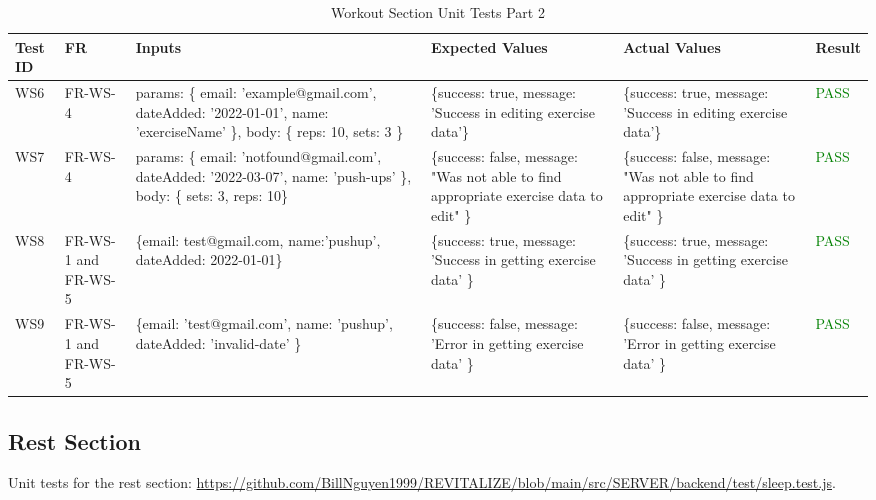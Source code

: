 \documentclass[12pt, titlepage]{article}
\begin{document}
\begin{table}[h]
    \centering
    \small
    \begin{tabularx}{\textwidth}{|X|X|p{3cm}|p{2.5cm}|p{2.5cm}|X|}
        \hline
        Test ID & FR & Inputs & Expected Values & Actual Values & Result \\
        \hline
        WS6 & FR-WS-4 & params: \{ email: 'example@gmail.com', dateAdded: '2022-01-01', name: 'exerciseName' \},
        body: \{ reps: 10, sets: 3 \}  & \{success: true, message: 'Success in editing exercise data'\} & \{success: true, message: 'Success in editing exercise data'\} & \textcolor{Green}{PASS} \\
        \hline
        WS7 & FR-WS-4 & params: \{ email: 'notfound@gmail.com', dateAdded: '2022-03-07', name: 'push-ups' \},
          body: \{ sets: 3, reps: 10\}  & \{success: false, message: "Was not able to find appropriate exercise data to edit" \} & \{success: false, message: "Was not able to find appropriate exercise data to edit" \} & \textcolor{Green}{PASS} \\
        \hline
        WS8 & FR-WS-1 and FR-WS-5 & \{email: test@gmail.com, name:'pushup', dateAdded: 2022-01-01\}  & \{success: true,
      message: 'Success in getting exercise data' \} & \{success: true, message: 'Success in getting exercise data' \} & \textcolor{Green}{PASS} \\
        \hline
        WS9 & FR-WS-1 and FR-WS-5 & \{email: 'test@gmail.com', name: 'pushup', dateAdded: 'invalid-date' \} & \{success: false, message: 'Error in getting exercise data' \} & \{success: false, message: 'Error in getting exercise data' \} & \textcolor{Green}{PASS} \\
        \hline
    \end{tabularx}
    \caption{Workout Section Unit Tests Part 2}
    \label{table:workout-unit-tests2}
\end{table}

\newpage

\subsection{Rest Section}

Unit tests for the rest section: \url{https://github.com/BillNguyen1999/REVITALIZE/blob/main/src/SERVER/backend/test/sleep.test.js}.
\end{document}
